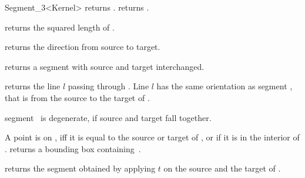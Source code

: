 \begin{ccRefClass} {Segment_3<Kernel>}
       {returns .}
\ccGlue
{}
       {returns .}

       {returns the squared length of \ccVar. }

       {returns the direction from source to target.}


       {returns a segment with source and target interchanged.}

       {returns the line $l$ passing through \ccVar. Line $l$  has the
        same orientation as segment \ccVar, that is 
        from the source to the target of \ccVar.}

       {segment \ccVar\ is degenerate, if source and target fall together.}


       {A point is on \ccVar, iff it is equal to the source or target
        of \ccVar, or if it is in the interior of \ccVar.}
% 
% 
       {returns a bounding box containing~\ccVar.}

       {returns the segment obtained by applying $t$ on the source
        and the target of \ccVar.}

\ccSeeAlso
{}\\

\end{ccRefClass} 
